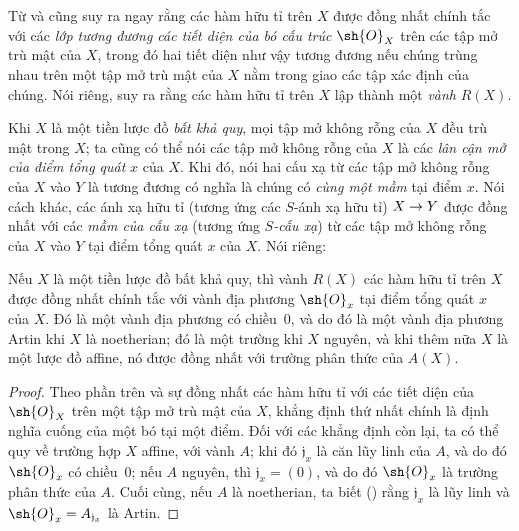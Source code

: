 \documentclass[oneside]{amsart}
\makeatletter
\newcommand{\ega@arrow}[2]{\mathchoice{#1}{#2}{#2}{#2}}
\renewcommand{\to}{\ega@arrow{\longrightarrow}{\rightarrow}}
\let\EGAOriginalLabel\label
\renewcommand{\label}[1]{\phantomsection\EGAOriginalLabel{#1}}
\makeatother
\begin{document}
\begin{env}[7.1.3]
\label{I.7.1.3}
Từ  và  cũng suy ra ngay rằng các hàm hữu tỉ trên $X$ được đồng nhất chính tắc với các \emph{lớp tương đương các tiết diện của bó cấu trúc $\sh{O}_X$} trên các tập mở trù mật của $X$, trong đó hai tiết diện như vậy tương đương nếu chúng trùng nhau trên một tập mở trù mật của $X$ nằm trong giao các tập xác định của chúng.
Nói riêng, suy ra rằng các hàm hữu tỉ trên $X$ lập thành một \emph{vành} $R(X)$.
\end{env}

\begin{env}[7.1.4]
\label{I.7.1.4}
Khi $X$ là một tiền lược đồ \emph{bất khả quy}, mọi tập mở không rỗng của $X$ đều trù mật trong $X$; ta cũng có thể nói các tập mở không rỗng của $X$ là các \emph{lân cận mở của điểm tổng quát} $x$ của $X$.
Khi đó, nói hai cấu xạ từ các tập mở không rỗng của $X$ vào $Y$ là tương đương có nghĩa là chúng có \emph{cùng một mầm} tại điểm $x$.
Nói cách khác, các ánh xạ hữu tỉ (tương ứng các $S$-ánh xạ hữu tỉ) $X\to Y$ được đồng nhất với các \emph{mầm của cấu xạ} (tương ứng \emph{$S$-cấu xạ}) từ các tập mở không rỗng của $X$ vào $Y$ tại điểm tổng quát $x$ của $X$.
Nói riêng:
\end{env}

\begin{proposition}[7.1.5]
\label{I.7.1.5}
Nếu $X$ là một tiền lược đồ bất khả quy, thì vành $R(X)$ các hàm hữu tỉ trên $X$ được đồng nhất chính tắc với vành địa phương $\sh{O}_x$ tại điểm tổng quát $x$ của $X$.
Đó là một vành địa phương có chiều~0, và do đó là một vành địa phương Artin khi $X$ là noetherian; đó là một trường khi $X$ nguyên, và khi thêm nữa $X$ là một lược đồ affine, nó được đồng nhất với trường phân thức của $A(X)$.
\end{proposition}

\begin{proof}
Theo phần trên và sự đồng nhất các hàm hữu tỉ với các tiết diện của $\sh{O}_X$ trên một tập mở trù mật của $X$, khẳng định thứ nhất chính là định nghĩa cuống của một bó tại một điểm.
Đối với các khẳng định còn lại, ta có thể quy về trường hợp $X$ affine, với vành $A$; khi đó $\mathfrak{j}_x$ là căn lũy linh của $A$, và do đó $\sh{O}_x$ có chiều~0; nếu $A$ nguyên, thì $\mathfrak{j}_x=(0)$, và do đó $\sh{O}_x$ là trường phân thức của $A$.
Cuối cùng, nếu $A$ là noetherian, ta biết (\cite[p.~127, cor.~4]{I-11}) rằng $\mathfrak{j}_x$ là lũy linh và $\sh{O}_x=A_{\mathfrak{j}_x}$ là Artin.
\end{proof}
\end{document}

